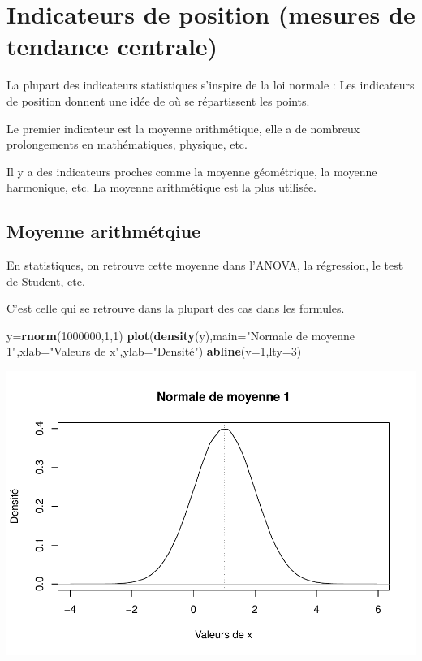 \documentclass[
]{book}
\newenvironment{Shaded}{\begin{snugshade}}{\end{snugshade}}
\newcommand{\AttributeTok}[1]{\textcolor[rgb]{0.13,0.29,0.53}{#1}}
\newcommand{\DecValTok}[1]{\textcolor[rgb]{0.00,0.00,0.81}{#1}}
\newcommand{\FunctionTok}[1]{\textcolor[rgb]{0.13,0.29,0.53}{\textbf{#1}}}
\newcommand{\NormalTok}[1]{#1}
\newcommand{\OtherTok}[1]{\textcolor[rgb]{0.56,0.35,0.01}{#1}}
\newcommand{\StringTok}[1]{\textcolor[rgb]{0.31,0.60,0.02}{#1}}
\begin{document}
\hypertarget{indicateurs-de-position-mesures-de-tendance-centrale}{%
\section{Indicateurs de position (mesures de tendance centrale)}\label{indicateurs-de-position-mesures-de-tendance-centrale}}

La plupart des indicateurs statistiques s'inspire de la loi normale : Les indicateurs
de position donnent une idée de où se répartissent les points.

Le premier indicateur est la moyenne arithmétique, elle a de nombreux
prolongements en mathématiques, physique, etc.

Il y a des indicateurs proches comme la moyenne géométrique, la moyenne harmonique, etc.
La moyenne arithmétique est la plus utilisée.

\hypertarget{moyenne-arithmuxe9tqiue}{%
\subsection{Moyenne arithmétqiue}\label{moyenne-arithmuxe9tqiue}}

En statistiques, on retrouve cette moyenne dans l'ANOVA, la régression, le test de
Student, etc.

C'est celle qui se retrouve dans la plupart des cas dans les formules.

\begin{Shaded}
\begin{Highlighting}[]
\NormalTok{y}\OtherTok{=}\FunctionTok{rnorm}\NormalTok{(}\DecValTok{1000000}\NormalTok{,}\DecValTok{1}\NormalTok{,}\DecValTok{1}\NormalTok{)}
\FunctionTok{plot}\NormalTok{(}\FunctionTok{density}\NormalTok{(y),}\AttributeTok{main=}\StringTok{"Normale de moyenne 1"}\NormalTok{,}\AttributeTok{xlab=}\StringTok{"Valeurs de x"}\NormalTok{,}\AttributeTok{ylab=}\StringTok{"Densité"}\NormalTok{)}
\FunctionTok{abline}\NormalTok{(}\AttributeTok{v=}\DecValTok{1}\NormalTok{,}\AttributeTok{lty=}\DecValTok{3}\NormalTok{)}
\end{Highlighting}
\end{Shaded}

\includegraphics{_main_files/figure-latex/unnamed-chunk-6-1.pdf}
\end{document}
